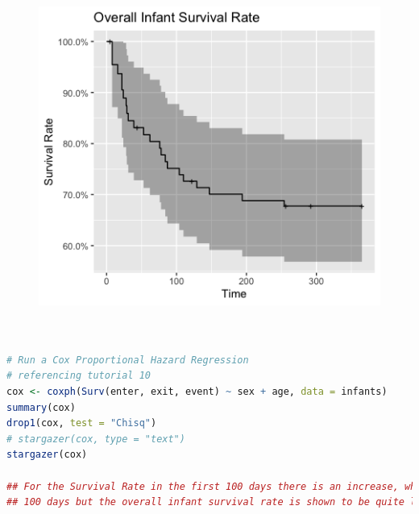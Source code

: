 \documentclass[12pt,letterpaper]{article}
\begin{document}
\begin{figure}
  \includegraphics[width=\textwidth]{Rplot.png}
\end{figure}






\begin{lstlisting}[language=R]


# Run a Cox Proportional Hazard Regression
# referencing tutorial 10
cox <- coxph(Surv(enter, exit, event) ~ sex + age, data = infants)
summary(cox)
drop1(cox, test = "Chisq")
# stargazer(cox, type = "text")
stargazer(cox)

## For the Survival Rate in the first 100 days there is an increase, which then decrease after 
## 100 days but the overall infant survival rate is shown to be quite low. 


\end{lstlisting}
\end{document}
